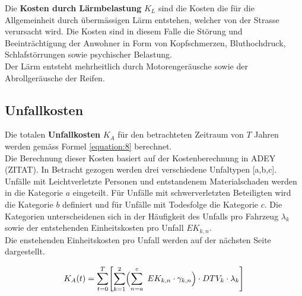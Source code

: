 Die \textbf{Kosten durch Lärmbelastung} $K_{L}$ sind die Kosten die für die Allgemeinheit durch übermässigen Lärm entstehen, welcher von der Strasse verursacht wird. 
Die Kosten sind in diesem Falle die Störung und Beeinträchtigung der Anwohner in Form von Kopfschmerzen, Bluthochdruck, Schlafstörrungen sowie psychischer Belastung. \\
Der Lärm entsteht mehrheitlich durch Motorengeräusche sowie der Abrollgeräusche der Reifen. 

\newpage

\subsection{Unfallkosten}
\label{sec:Unfallkosten}

Die totalen \textbf{Unfallkosten} $K_{A}$ für den betrachteten Zeitraum von $T$ Jahren werden gemäss Formel \ref{equation:8} berechnet. \\
Die Berechnung dieser Kosten basiert auf der Kostenberechnung in ADEY (ZITAT).
In Betracht gezogen werden drei verschiedene Unfaltypen [a,b,c]. Unfälle mit Leichtverletzte Personen und entstandenem Materialschaden werden in die Kategorie $a$ eingeteilt. Für Unfälle mit schwerverletzten Beteiligten wird die Kategorie $b$ definiert und für Unfälle mit Todesfolge die Kategorie $c$. Die Kategorien unterscheidenen sich in der Häufigkeit des Unfalls pro Fahrzeug \( \lambda_{k} \) sowie der entstehenden Einheitskosten pro Unfall $EK_{k,n}$. \\
Die enstehenden Einheitskosten pro Unfall werden auf der nächsten Seite dargestellt.

\begin{equation}
K_{A}(t) = \sum_{t=0}^T \Biggl[ \sum_{k=1}^2 \Bigl( \sum_{n=a}^c \ EK_{k,n} \cdot \gamma_{k,n} \Bigr) \cdot DTV_{k} \cdot \lambda_{k} \Biggr] 
\label{equation:8}
\end{equation}

